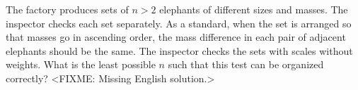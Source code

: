 \problem
The factory produces sets of $n > 2$ elephants of different sizes and masses.
The inspector checks each set separately.
As a standard, when the set is arranged so that masses go in ascending order,
the mass difference in each pair of adjacent elephants should be the same.
The inspector checks the sets with scales without weights.
What is the least possible $n$ such that this test can be organized
correctly?
\solution
<FIXME: Missing English solution.>
\endproblem
